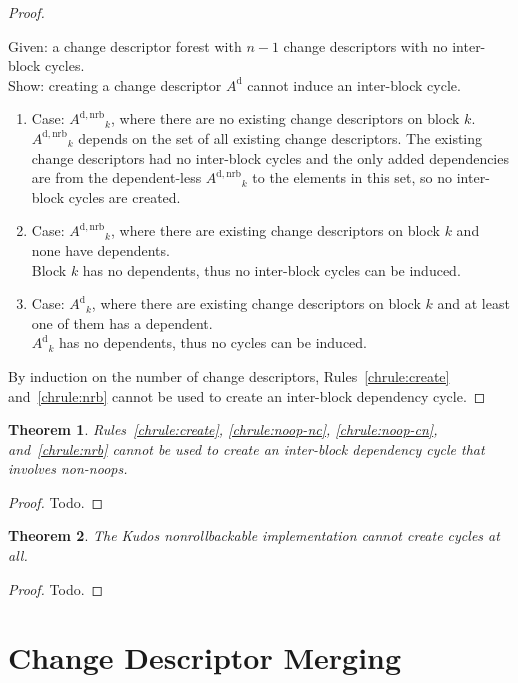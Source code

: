 \documentclass{article}
\newtheorem{thm}{Theorem}[section]
\theoremstyle{definition}
\newcommand{\cd}[1]{\ensuremath{#1}}
\newcommand{\cdb}[2]{\ensuremath{\cd{#1}_#2}}
\newcommand{\dcd}[1]{\ensuremath{\cd{#1}^\mathrm{d}}}
\newcommand{\dnrb}[1]{\ensuremath{\cd{#1}^\mathrm{d,nrb}}}
\begin{document}
\begin{proof}
\begin{itemize}
      Given: a change descriptor forest with $n-1$ change descriptors with no
      inter-block cycles.\\
      Show: creating a change descriptor \dcd{A} cannot induce an inter-block
      cycle.
      \begin{enumerate}
      \item Case: \cdb{\dnrb{A}}{k}, where there are no existing
        change descriptors on block $k$.\\
        \cdb{\dnrb{A}}{k} depends on the set of all existing change
        descriptors.  The existing change descriptors had no
        inter-block cycles and the only added dependencies are from
        the dependent-less \cdb{\dnrb{A}}{k} to the elements in this
        set, so no inter-block cycles are created.
      \item Case: \cdb{\dnrb{A}}{k}, where there are existing change
        descriptors on block $k$ and none have dependents.\\
        Block $k$ has no dependents, thus no inter-block cycles can be
        induced.
      \item Case: \cdb{\dcd{A}}{k}, where there are existing change
        descriptors on block $k$ and at least one of them has a dependent.\\
        \cdb{\dcd{A}}{k} has no dependents, thus no cycles can be induced.
      \end{enumerate}
  \end{itemize}
  By induction on the number of change descriptors, Rules~\ref{chrule:create}
  and~\ref{chrule:nrb} cannot be used to create an inter-block dependency
  cycle.
\end{proof}

\begin{thm}\label{thm::nrbnoopsafe}
  Rules~\ref{chrule:create}, \ref{chrule:noop-nc}, \ref{chrule:noop-cn},
  and~\ref{chrule:nrb} cannot be used to create an inter-block dependency
  cycle that involves non-noops.
\end{thm}
\begin{proof}
  Todo.
\end{proof}

\begin{thm}\label{thm::nrbimpsafe}
  The Kudos nonrollbackable implementation cannot create cycles at all.
\end{thm}
\begin{proof}
  Todo.
\end{proof}

\section{Change Descriptor Merging}
\end{document}
